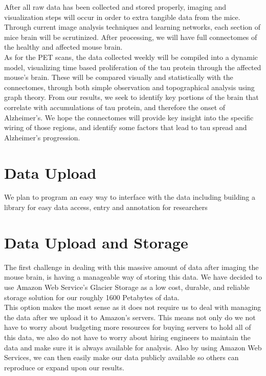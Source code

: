 \documentclass{article}
\newcommand{\ind}[0]{\indent}
\begin{document}
\ind\ind After all raw data has been collected and stored properly, imaging and visualization steps will occur in order to extra tangible data from the mice. Through current image analysis techniques and learning networks, each section of mice brain will be scrutinized. After processing, we will have full connectomes of the healthy and affected mouse brain. \\

As for the PET scans, the data collected weekly will be compiled into a dynamic model, visualizing time based proliferation of the tau protein through the affected mouse’s brain. These will be compared visually and statistically with the connectomes, through both simple observation and topographical analysis using graph theory. From our results, we seek to identify key portions of the brain that correlate with accumulations of tau protein, and therefore the onset of Alzheimer's. We hope the connectomes will provide key insight into the specific wiring of those regions, and identify some factors that lead to tau spread and Alzheimer’s progression. 


\section{Data Upload}

\ind\ind We plan to program an easy way to interface with the data including building a library for easy data access, entry and annotation for researchers

\section{Data Upload and Storage}

\ind\ind The first challenge in dealing with this massive amount of data after imaging the mouse brain, is having a manageable way of storing this data. We have decided to use Amazon Web Service’s Glacier Storage as a low cost, durable, and reliable storage solution for our roughly 1600 Petabytes of data. \\

This option makes the most sense as it does not require us to deal with managing the data after we upload it to Amazon’s servers. This means not only do we not have to worry about budgeting more resources for buying servers to hold all of this data, we also do not have to worry about hiring engineers to maintain the data and make sure it is always available for analysis.  Also by using Amazon Web Services, we can then easily make our data publicly available so others can reproduce or expand upon our results.
\end{document}

